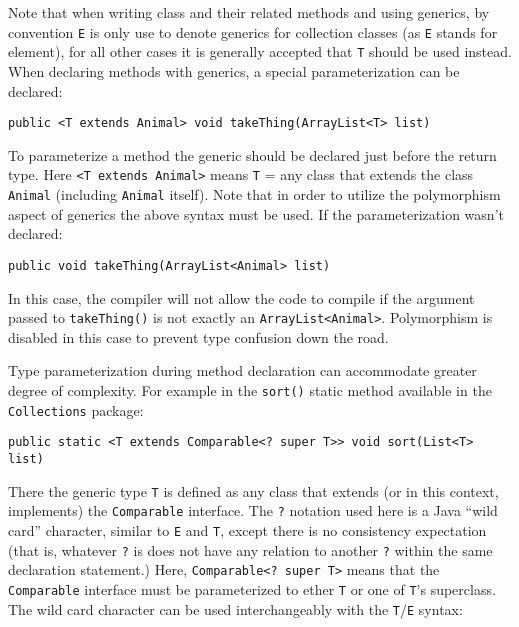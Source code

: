 \documentclass{tufte-handout}
\begin{document}
    Note that when writing class and their related methods and using generics, by convention \texttt{E} is only use to denote generics for collection classes (as \texttt{E} stands for element), for all other cases it is generally accepted that \texttt{T} should be used instead. When declaring methods with generics, a special parameterization can be declared:

    \begin{lstlisting}
public <T extends Animal> void takeThing(ArrayList<T> list)
    \end{lstlisting}

    To parameterize a method the generic should be declared just before the return type. Here \texttt{<T extends Animal>} means \texttt{T} = any class that extends the class \texttt{Animal} (including \texttt{Animal} itself). Note that in order to utilize the polymorphism aspect of generics the above syntax must be used. If the parameterization wasn't declared:

    \begin{lstlisting}
public void takeThing(ArrayList<Animal> list)
    \end{lstlisting}

    In this case, the compiler will not allow the code to compile if the argument passed to \texttt{takeThing()} is not exactly an \texttt{ArrayList<Animal>}. Polymorphism is disabled in this case to prevent type confusion down the road.

    Type parameterization during method declaration can accommodate greater degree of complexity. For example in the \texttt{sort()} static method available in the \texttt{Collections} package:

    \begin{lstlisting}
public static <T extends Comparable<? super T>> void sort(List<T> list)
    \end{lstlisting}

    There the generic type \texttt{T} is defined as any class that extends (or in this context, implements) the \texttt{Comparable} interface. The \texttt{?} notation used here is a Java ``wild card'' character, similar to \texttt{E} and \texttt{T}, except there is no consistency expectation (that is, whatever \texttt{?} is does not have any relation to another \texttt{?} within the same declaration statement.) Here, \texttt{Comparable<? super T>} means that the \texttt{Comparable} interface must be parameterized to ether \texttt{T} or one of \texttt{T}'s superclass. The wild card character can be used interchangeably with the \texttt{T}/\texttt{E} syntax:
\end{document}
